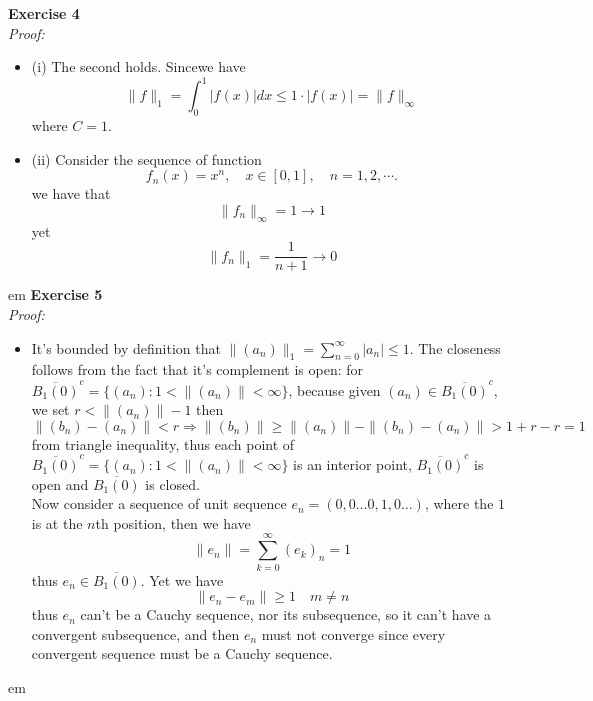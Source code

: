 \documentclass[12pt]{article}
\def\ep#1#2{{\bf Exercise #1}\\{\it Proof:}\begin{itemize}
 \setlength{\itemsep}{2pt}
 \setlength{\parskip}{0pt}
 \setlength{\parsep}{0pt}
 #2
 \end{itemize}\vskip 1 em}
\begin{document}
\ep{4}{
\item[(i)] The second holds. Sincewe have 
$$
\|f\|_1=\int_0^1|f(x)|dx\leq1\cdot|f(x)|=\|f\|_{\infty}
$$
where $C=1$.
\item[(ii)] Consider the sequence of function
$$
f_n(x)=x^n,\quad x\in [0,1],\quad n=1,2,\cdots.
$$
we have that 
$$
\|f_n\|_{\infty}=1\to 1
$$
yet 
$$
\|f_n\|_{1}=\frac{1}{n+1}\to 0
$$
}
\ep{5}{
\item[]
It's bounded by definition that $\|(a_n)\|_1=\sum_{n=0}^{\infty}|a_n|\leq1$. The closeness follows from the fact that it's complement is open: for 
$\overline{B_1(0)}^{c}=\{(a_n):1<\|(a_n)\|<\infty\}$, because given
 $(a_n)\in\overline{B_1(0)}^{c}$, we set $r<\|(a_n)\|-1$ then
 $$
 \|(b_n)-(a_n)\|<r\Longrightarrow \|(b_n)\|\ge\|(a_n)\|-\|(b_n)-(a_n)\|>1+r-r=1
 $$
 from triangle inequality, thus each point of $\overline{B_1(0)}^{c}=\{(a_n):1<\|(a_n)\|<\infty\}$ is an interior point, $\overline{B_1(0)}^{c}$ is open and $\overline{B_1(0)}$
 is closed.\\
 Now consider a sequence of unit sequence $e_n=(0,0\ldots0,1,0\ldots)$, where the $1$ is at the $n$th position, then we have 
 $$
 \|e_n\|=\sum_{k=0}^{\infty}(e_k)_n=1
 $$
 thus $e_n\in\overline{B_1(0)}$. Yet we have
 $$
 \|e_n-e_m\|\ge 1\quad m\neq n
 $$
thus $e_n$ can't be a Cauchy sequence, nor its subsequence, so it can't have a convergent subsequence, and then $e_n$ must not converge since every convergent sequence must be a Cauchy sequence.
}
\end{document}
